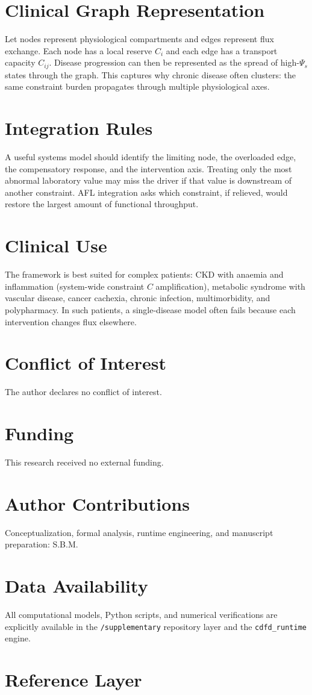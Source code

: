 \documentclass[11pt]{article}
\begin{document}
\section{Clinical Graph Representation}
Let nodes represent physiological compartments and edges represent flux exchange. Each node has a local reserve $C_i$ and each edge has a transport capacity $C_{ij}$. Disease progression can then be represented as the spread of high-$\Psi_s$ states through the graph. This captures why chronic disease often clusters: the same constraint burden propagates through multiple physiological axes.

\section{Integration Rules}
A useful systems model should identify the limiting node, the overloaded edge, the compensatory response, and the intervention axis. Treating only the most abnormal laboratory value may miss the driver if that value is downstream of another constraint. AFL integration asks which constraint, if relieved, would restore the largest amount of functional throughput.

\section{Clinical Use}
The framework is best suited for complex patients: CKD with anaemia and inflammation (system-wide constraint $C$ amplification), metabolic syndrome with vascular disease, cancer cachexia, chronic infection, multimorbidity, and polypharmacy. In such patients, a single-disease model often fails because each intervention changes flux elsewhere.



\section*{Conflict of Interest} The author declares no conflict of interest.
\section*{Funding} This research received no external funding.
\section*{Author Contributions} Conceptualization, formal analysis, runtime engineering, and manuscript preparation: S.B.M.
\section*{Data Availability} All computational models, Python scripts, and numerical verifications are explicitly available in the \texttt{/supplementary} repository layer and the \texttt{cdfd\_runtime} engine.

\section{Reference Layer}


\end{document}
